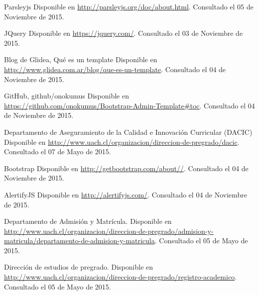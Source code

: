 \begin{spacing}{1.0}
\begin{thebibliography}{99}
\newblock Parsleyjs
\newblock Disponible en \url{http://parsleyjs.org/doc/about.html}.
\newblock Consultado el 05 de Noviembre de 2015.

\newblock JQuery
\newblock Disponible en \url{https://jquery.com/}.
\newblock Consultado el 03 de Noviembre de 2015.

\newblock Blog de Glidea, Qué es un template
\newblock Disponible en \url{http://www.glidea.com.ar/blog/que-es-un-template}.
\newblock Consultado el 04 de Noviembre de 2015.

\newblock GitHub, github/onokumus
\newblock Disponible en \url{https://github.com/onokumus/Bootstrap-Admin-Template#toc}.
\newblock Consultado el 04 de Noviembre de 2015.

\newblock Departamento de Aseguramiento de la Calidad e Innovación Curricular (DACIC)
\newblock Disponible en \url{http://www.uach.cl/organizacion/direccion-de-pregrado/dacic}.
\newblock Consultado el 07 de Mayo de 2015.

\newblock Bootstrap
\newblock Disponible en \url{http://getbootstrap.com/about//}.
\newblock Consultado el 04 de Noviembre de 2015.

\newblock AlertifyJS
\newblock Disponible en \url{http://alertifyjs.com/}.
\newblock Consultado el 04 de Noviembre de 2015.

\newblock Departamento de Admisión y Matrícula.
\newblock Disponible en \url{http://www.uach.cl/organizacion/direccion-de-pregrado/admision-y-matricula/departamento-de-admision-y-matricula}.
\newblock Consultado el 05 de Mayo de 2015.


\newblock Dirección de estudios de pregrado.
\newblock Disponible en \url{http://www.uach.cl/organizacion/direccion-de-pregrado/registro-academico}.
\newblock Consultado el 05 de Mayo de 2015.





\end{thebibliography}	
\end{spacing}
